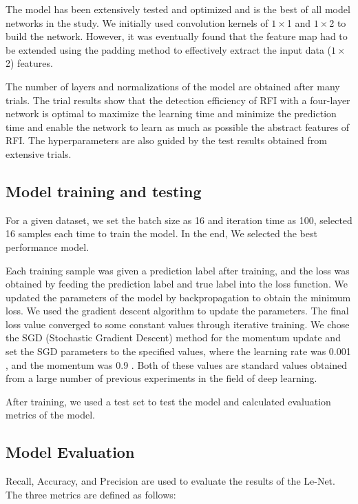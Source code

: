 \documentclass[usenatbib]{mnras}
\begin{document}
The model has been extensively tested and optimized and is the best of all model networks in the study. 
We initially used convolution kernels of $1\times$1 and $1\times$2 to build the network. However, it was eventually found that the feature map had to be extended using the padding method to effectively extract the input data ($1\times$2) features.

The number of layers and normalizations of the model are obtained after many trials. The trial results show that the detection efficiency of RFI with a four-layer network is optimal to maximize the learning time and minimize the prediction time and enable the network to learn as much as possible the abstract features of RFI.
The hyperparameters are also guided by the test results obtained from extensive trials. 


\subsection{Model training and testing}

For a given dataset, we set the batch size as 16 and iteration time as 100, selected 16 samples each time to train the model. In the end, We selected the best performance model.

Each training sample was given a prediction label after training, and the loss was obtained by feeding the prediction label and true label into the loss function. We updated the parameters of the model by backpropagation to obtain the minimum loss. We used the gradient descent algorithm to update the parameters. The final loss value converged
to some constant values through iterative training. We chose the SGD (Stochastic Gradient Descent) \citep{2012Efficient} method for the momentum update and set the SGD parameters to the specified values, where the learning rate was 0.001 \citep{wilson2003general}, and the momentum was 0.9 \citep{sutskever2013importance}. Both of these values are standard values obtained from a large number of previous experiments in the field of deep learning.

After training, we used a test set to test the model and calculated evaluation metrics of the model.

\subsection{Model Evaluation}
Recall, Accuracy, and Precision are used to evaluate the results of the Le-Net. The three metrics are defined as follows:
\end{document}
